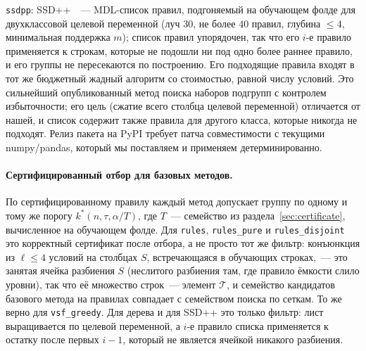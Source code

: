 \documentclass[11pt]{article}
\begin{document}
\texttt{ssdpp}: SSD++~\citep{proenca2022}~--- MDL-список правил, подгоняемый на обучающем фолде для двухклассовой целевой переменной (луч 30, не более 40 правил, глубина $\le4$, минимальная поддержка $m$); список правил упорядочен, так что его $i$-е правило применяется к строкам, которые не подошли ни под одно более раннее правило, и его группы не пересекаются по построению. Его подходящие правила входят в тот же бюджетный жадный алгоритм со стоимостью, равной числу условий. Это сильнейший опубликованный метод поиска наборов подгрупп с контролем избыточности; его цель (сжатие всего столбца целевой переменной) отличается от нашей, и список содержит также правила для другого класса, которые никогда не подходят. Релиз пакета на PyPI требует патча совместимости с текущими numpy/pandas, который мы поставляем и применяем детерминированно.

\paragraph{Сертифицированный отбор для базовых методов.} По сертифицированному правилу каждый метод допускает группу по одному и тому же порогу $k^*(n,\tau,\alpha/T)$, где $T$~--- семейство из раздела~\ref{sec:certificate}, вычисленное на обучающем фолде. Для \texttt{rules}, \texttt{rules\_pure} и \texttt{rules\_disjoint} это корректный сертификат после отбора, а не просто тот же фильтр: конъюнкция из $\ell\le4$ условий на столбцах $S$, встречающаяся в обучающих строках,~--- это занятая ячейка разбиения $S$ (неслитого разбиения там, где правило ёмкости слило уровни), так что её множество строк~--- элемент $\mathcal{T}$, и семейство кандидатов базового метода на правилах совпадает с семейством поиска по сеткам. То же верно для \texttt{vsf\_greedy}. Для дерева и для SSD++ это только фильтр: лист выращивается по целевой переменной, а $i$-е правило списка применяется к остатку после первых $i-1$, который не является ячейкой никакого разбиения.
\end{document}
